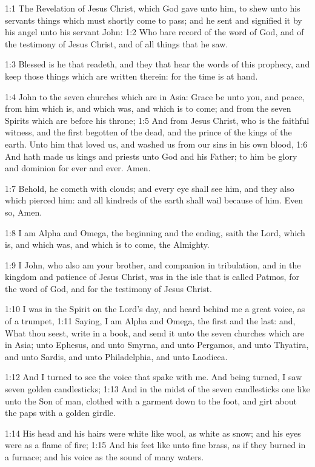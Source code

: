 
1:1 The Revelation of Jesus Christ, which God gave unto him, to shew unto his servants things which must shortly come to pass; and he sent and signified it by his angel unto his servant John: 1:2 Who bare record of the word of God, and of the testimony of Jesus Christ, and of all things that he saw.

1:3 Blessed is he that readeth, and they that hear the words of this prophecy, and keep those things which are written therein: for the time is at hand.

1:4 John to the seven churches which are in Asia: Grace be unto you, and peace, from him which is, and which was, and which is to come; and from the seven Spirits which are before his throne; 1:5 And from Jesus Christ, who is the faithful witness, and the first begotten of the dead, and the prince of the kings of the earth. Unto him that loved us, and washed us from our sins in his own blood, 1:6 And hath made us kings and priests unto God and his Father; to him be glory and dominion for ever and ever. Amen.

1:7 Behold, he cometh with clouds; and every eye shall see him, and they also which pierced him: and all kindreds of the earth shall wail because of him. Even so, Amen.

1:8 I am Alpha and Omega, the beginning and the ending, saith the Lord, which is, and which was, and which is to come, the Almighty.

1:9 I John, who also am your brother, and companion in tribulation, and in the kingdom and patience of Jesus Christ, was in the isle that is called Patmos, for the word of God, and for the testimony of Jesus Christ.

1:10 I was in the Spirit on the Lord's day, and heard behind me a great voice, as of a trumpet, 1:11 Saying, I am Alpha and Omega, the first and the last: and, What thou seest, write in a book, and send it unto the seven churches which are in Asia; unto Ephesus, and unto Smyrna, and unto Pergamos, and unto Thyatira, and unto Sardis, and unto Philadelphia, and unto Laodicea.

1:12 And I turned to see the voice that spake with me. And being turned, I saw seven golden candlesticks; 1:13 And in the midst of the seven candlesticks one like unto the Son of man, clothed with a garment down to the foot, and girt about the paps with a golden girdle.

1:14 His head and his hairs were white like wool, as white as snow; and his eyes were as a flame of fire; 1:15 And his feet like unto fine brass, as if they burned in a furnace; and his voice as the sound of many waters.

